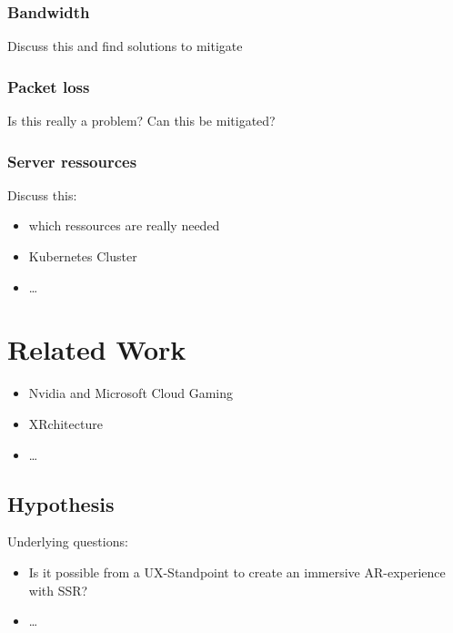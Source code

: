 \documentclass[titlepage, a4paper, 11pt]{scrartcl}
\begin{document}
            \subsubsection{Bandwidth}

                Discuss this and find solutions to mitigate

            \subsubsection{Packet loss}

                Is this really a problem?
                Can this be mitigated?

            \subsubsection{Server ressources}

                Discuss this:

                \begin{itemize}
                    \item which ressources are really needed 
                    \item Kubernetes Cluster
                    \item \dots
                \end{itemize}
        
        \section{Related Work}

                \begin{itemize}
                    \item Nvidia and Microsoft Cloud Gaming
                    \item XRchitecture
                    \item \dots
                \end{itemize}

        \subsection{Hypothesis}

            Underlying questions:

            \begin{itemize}
                \item Is it possible from a UX-Standpoint to create an immersive AR-experience with SSR?
                \item \dots
            \end{itemize}
\end{document}
